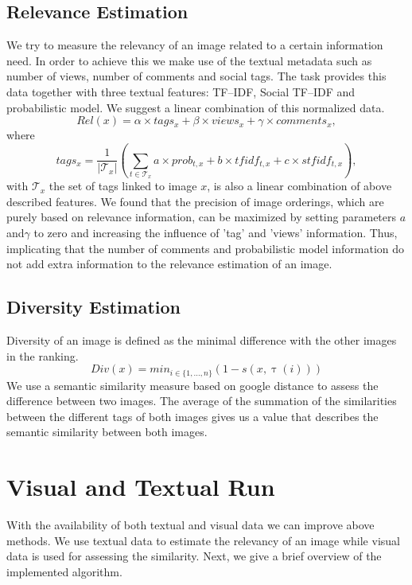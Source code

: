 \documentclass{acm_proc_article-me11_tweaked}
\begin{document}
\subsection{Relevance Estimation}
\label{text-relevance}
We try to measure the relevancy of an image related to a certain information need.
In order to achieve this we make use of the textual metadata such as number of views, number of comments and social tags.
The task provides this data together with three textual features: TF--IDF, Social TF--IDF and probabilistic model.
We suggest a linear combination of this normalized data.
$$
Rel(x) = \alpha \times tags_x + \beta \times views_x + \gamma \times comments_x,
$$
where
$$
tags_x = \frac{1}{|\mathscr{T}_x|} \left( \sum_{t \in \mathscr{T}_x} a\times prob_{t,x} + b\times tfidf_{t,x} + c\times stfidf_{t,x}\right), 
$$
with $\mathscr{T}_x$ the set of tags linked to image $x$,
is also a linear combination of above described features.
We found that the precision of image orderings, which are purely based on relevance information, can be maximized by setting parameters $a$ and$\gamma$ to zero and increasing the influence of 'tag' and 'views' information.
Thus, implicating that the number of comments and probabilistic model information do not add extra information to the relevance estimation of an image.




\subsection{Diversity Estimation}
Diversity of an image is defined as the minimal difference with the other images in the ranking.
$$Div(x) = min_{i \in \{1,\ldots,n\}}\left( 1 - s(x, \uptau(i))\right)$$
We use a semantic similarity measure based on google distance \cite{google-distance} to assess the difference between two images.
The average of the summation of the similarities between the different tags of both images gives us a value that describes the semantic similarity between both images.


\section{Visual and Textual Run}
With the availability of both textual and visual data we can improve above methods.
We use textual data to estimate the relevancy of an image while visual data is used for assessing the similarity.
Next, we give a brief overview of the implemented algorithm.
\end{document}
